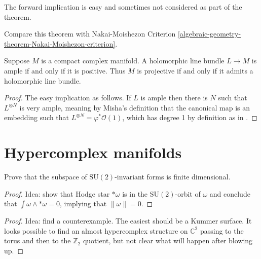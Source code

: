 The forward implication is easy and sometimes not considered as part of the
theorem.

Compare this theorem with Nakai-Moishezon Criterion
\ref{algebraic-geometry-theorem-Nakai-Moishezon-criterion}.

\begin{theorem}
\label{theorem-Kodaira-embedding}
\begin{reference}
\cite[Theorem 10.12]{lec}
\end{reference}
Suppose $M$ is a compact complex manifold. A holomorphic line bundle $L\to M$ is
ample if and only if it is positive. Thus $M$ is projective if and only if it
admits a holomorphic line bundle.
\end{theorem}

\begin{proof}
The easy implication as follows. If $L$ is ample then there is $N$ such that
$L^{\otimes N}$ is very ample, meaning by Misha's definition that the canonical
map is an embedding such that $L^{\otimes N}=\varphi^*\mathcal{O}(1)$, which has
degree 1 by definition as in \cite[15.4.14]{sea}.
\end{proof}

\section{Hypercomplex manifolds}
\label{section-hypercomplex-manifolds}

\begin{exercise}
\label{exercise-SU2-invariant-forms}
Prove that the subspace of $\text{SU}(2)$-invariant forms is finite dimensional.
\end{exercise}

\begin{proof}
Idea: show that
Hodge star $*\omega$ is in the $\text{SU}(2)$-orbit of $\omega$ and conclude
that $\int \omega\wedge *\omega=0$, implying that $\|\omega\|=0$.
\end{proof}

\begin{exercise}
\label{exercise-closed-fundamental-forms-on-almost-hypercomplex-manifold}

\end{exercise}

\begin{proof}
Idea: find a counterexample. The easiest should be a Kummer surface. It looks
possible to find an almost hypercomplex structure on $\mathbb{C}^2$ passing to
the torus and then to the $\mathbb{Z}_2$ quotient, but not clear what will
happen after blowing up.
\end{proof}





